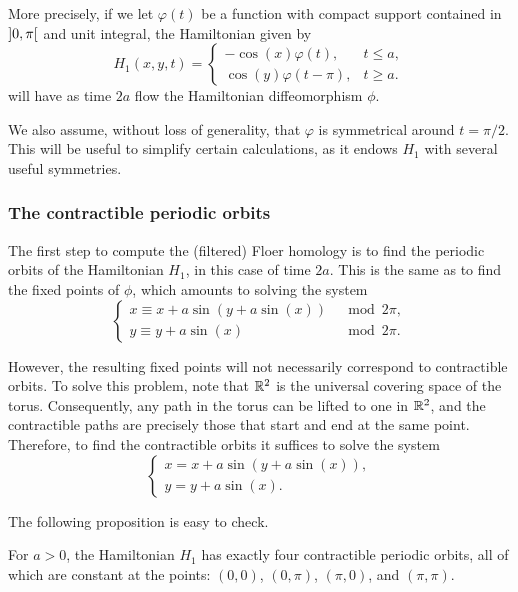 More precisely, if we let $\varphi(t)$ be a function with compact support contained in $\ointerval 0 \pi$ and unit integral, the Hamiltonian given by
\begin{equation}
H_1(x,y,t) = \begin{cases}
-\cos(x) \varphi(t), & t \leq a,\\
\cos(y) \varphi(t-\pi), & t \geq a.
\end{cases}
\end{equation}
will have as time $2a$	 flow the Hamiltonian diffeomorphism $\phi$.

We also assume, without loss of generality, that $\varphi$ is symmetrical around $t = \pi/2$. This will be useful to simplify certain calculations, as it endows $H_1$ with several useful symmetries.

\subsubsection{The contractible periodic orbits}

The first step to compute the (filtered) Floer homology is to find the periodic orbits of the Hamiltonian $H_1$, in this case of time $2a$. This is the same as to find the fixed points of $\phi$, which amounts to solving the system
\begin{equation}
\begin{cases}
x \equiv x + a \sin(y + a \sin(x)) &\mod 2\pi,\\
y \equiv y + a \sin(x) &\mod 2\pi.
\end{cases}
\end{equation}

However, the resulting fixed points will not necessarily correspond to contractible orbits. To solve this problem, note that $\mathbb{R}^2$ is the universal covering space of the torus. Consequently, any path in the torus can be lifted to one in $\mathbb{R}^2$, and the contractible paths are precisely those that start and end at the same point. Therefore, to find the contractible orbits it suffices to solve the system
\begin{equation}
\begin{cases}
x = x + a \sin(y + a \sin(x)),\\
y = y + a \sin(x).
\end{cases}
\end{equation}

The following proposition is easy to check.

\begin{prop}
For $a > 0$, the Hamiltonian $H_1$ has exactly four contractible periodic orbits, all of which are constant at the points: $(0,0)$, $(0,\pi)$, $(\pi,0)$, and $(\pi,\pi)$.
\end{prop}

